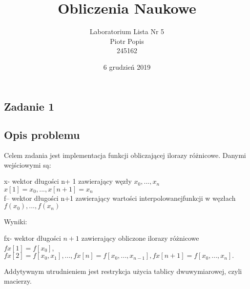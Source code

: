 \documentclass[11pt]{article}
\begin{document}
\title{{Obliczenia Naukowe}}
\author{Laboratorium Lista Nr 5\\Piotr Popis\\ 245162}
\date{6 grudzień 2019}
\maketitle
\centering

\begin{flushleft}
\section{Zadanie 1}
\bigskip
\subsection{Opis problemu}
\bigskip
Celem zadania jest implementacja funkcji obliczającej ilorazy różnicowe. Danymi wejściowymi są:
\begin{center}
x- wektor długości n+ 1 zawierający węzły $x_0, . . . , x_n$  $x[1]=x_0,...,x[n+1]=x_n$\\
f– wektor długości n+1 zawierający wartości interpolowanejfunkcji w węzłach $f(x_0), . . . , f(x_n)$\\
\begin{flushleft}
Wyniki:
\end{flushleft}
fx- wektor długości $n+1$ zawierający obliczone ilorazy różnicowe\\ $fx[1]=f[x_0]$,\\$fx[2]=f[x_0, x_1],...,fx[n]=f[x_0, . . . , x_{n−1}],fx[n+1]=f[x_0, . . . , x_n].$
\begin{flushleft}
Addytywnym utrudnieniem jest restrykcja użycia tablicy dwuwymiarowej, czyli macierzy.
\end{flushleft}
\end{center}

\end{flushleft}
\end{document}
